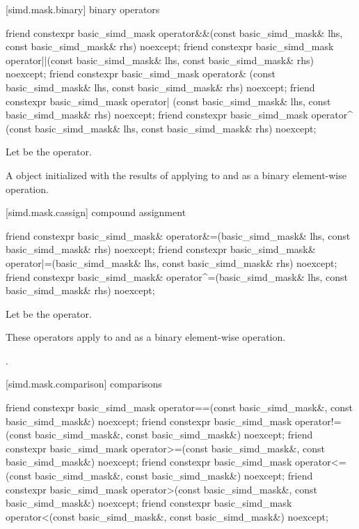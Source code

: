 [simd.mask.binary]{ binary operators}

\begin{itemdecl}
friend constexpr basic_simd_mask
  operator&&(const basic_simd_mask& lhs, const basic_simd_mask& rhs) noexcept;
friend constexpr basic_simd_mask
  operator||(const basic_simd_mask& lhs, const basic_simd_mask& rhs) noexcept;
friend constexpr basic_simd_mask
  operator& (const basic_simd_mask& lhs, const basic_simd_mask& rhs) noexcept;
friend constexpr basic_simd_mask
  operator| (const basic_simd_mask& lhs, const basic_simd_mask& rhs) noexcept;
friend constexpr basic_simd_mask
  operator^ (const basic_simd_mask& lhs, const basic_simd_mask& rhs) noexcept;
\end{itemdecl}

\begin{itemdescr}
\pnum
Let  be the operator.

\pnum
\returns
A  object initialized with the results of applying
 to  and  as a binary element-wise
operation.
\end{itemdescr}

[simd.mask.cassign]{ compound assignment}

\begin{itemdecl}
friend constexpr basic_simd_mask&
  operator&=(basic_simd_mask& lhs, const basic_simd_mask& rhs) noexcept;
friend constexpr basic_simd_mask&
  operator|=(basic_simd_mask& lhs, const basic_simd_mask& rhs) noexcept;
friend constexpr basic_simd_mask&
  operator^=(basic_simd_mask& lhs, const basic_simd_mask& rhs) noexcept;
\end{itemdecl}

\begin{itemdescr}
\pnum
Let  be the operator.

\pnum
\effects
These operators apply  to  and  as a
binary element-wise operation.

\pnum
\returns
{}.
\end{itemdescr}

[simd.mask.comparison]{ comparisons}

\begin{itemdecl}
friend constexpr basic_simd_mask
  operator==(const basic_simd_mask&, const basic_simd_mask&) noexcept;
friend constexpr basic_simd_mask
  operator!=(const basic_simd_mask&, const basic_simd_mask&) noexcept;
friend constexpr basic_simd_mask
  operator>=(const basic_simd_mask&, const basic_simd_mask&) noexcept;
friend constexpr basic_simd_mask
  operator<=(const basic_simd_mask&, const basic_simd_mask&) noexcept;
friend constexpr basic_simd_mask
  operator>(const basic_simd_mask&, const basic_simd_mask&) noexcept;
friend constexpr basic_simd_mask
  operator<(const basic_simd_mask&, const basic_simd_mask&) noexcept;
\end{itemdecl}


